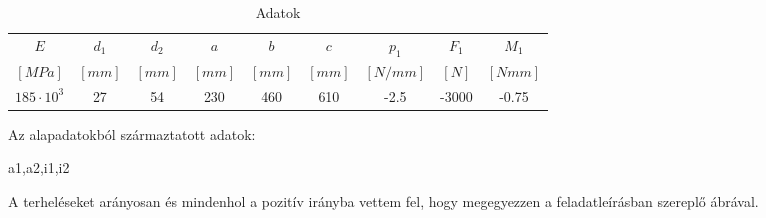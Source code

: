 \documentclass{article}
\begin{document}
	\begin{table}[h!]
		\begin{center}
			\caption{Adatok}
			\label{tab:table1}
			\begin{tabular}{c|c|c|c|c|c|c|c|c} %
				$E$ & $d_{1}$ & $d_{2}$ & $a$ & $b$ & $c$ & $p_{1}$ & $F_{1}$ & $M_{1}$ \\
				$[MPa]$ & $[mm]$ & $[mm]$ & $[mm]$ & $[mm]$ & $[mm]$ & $[N/mm]$ & $[N]$ & $[Nmm]$\\
				\hline
				$185\cdot10^3$ & 27 & 54 & 230 & 460 & 610 & -2.5 & -3000 & -0.75\\
			\end{tabular}
		\end{center}
	\end{table}

	Az alapadatokból származtatott adatok:
	
	a1,a2,i1,i2
	
	\begin{flushleft}
		A terheléseket arányosan és mindenhol a pozitív irányba vettem fel, hogy megegyezzen a feladatleírásban szereplő ábrával.
	\end{flushleft}
	
	\newcommand{\degy}{8}
	\newcommand{\dketto}{16}
	
\end{document}
